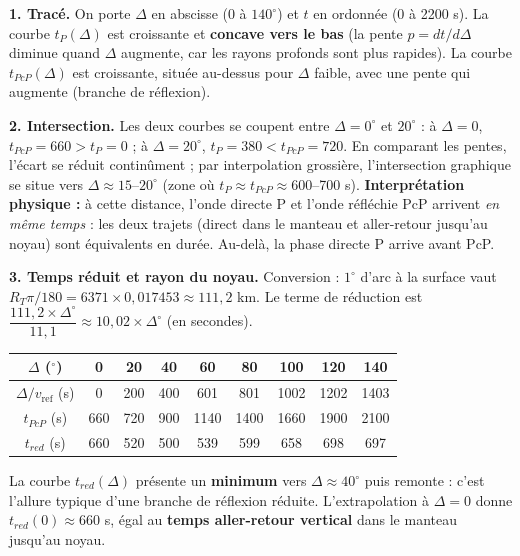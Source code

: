 \documentclass[11pt]{article}
\begin{document}
\begin{corrige}
\textbf{1. Tracé.} On porte $\Delta$ en abscisse (0 à $140^\circ$) et $t$ en ordonnée (0 à 2200 s). La courbe $t_P(\Delta)$ est croissante et \textbf{concave vers le bas} (la pente $p = dt/d\Delta$ diminue quand $\Delta$ augmente, car les rayons profonds sont plus rapides). La courbe $t_{PcP}(\Delta)$ est croissante, située au-dessus pour $\Delta$ faible, avec une pente qui augmente (branche de réflexion).

\textbf{2. Intersection.} Les deux courbes se coupent entre $\Delta = 0^\circ$ et $20^\circ$ : à $\Delta = 0$, $t_{PcP} = 660 > t_P = 0$ ; à $\Delta = 20^\circ$, $t_P = 380 < t_{PcP} = 720$. En comparant les pentes, l'écart se réduit continûment ; par interpolation grossière, l'intersection graphique se situe vers $\Delta \approx 15$--$20^\circ$ (zone où $t_P \approx t_{PcP} \approx 600$--700 s). \textbf{Interprétation physique :} à cette distance, l'onde directe P et l'onde réfléchie PcP arrivent \emph{en même temps} : les deux trajets (direct dans le manteau et aller-retour jusqu'au noyau) sont équivalents en durée. Au-delà, la phase directe P arrive avant PcP.

\textbf{3. Temps réduit et rayon du noyau.} Conversion : $1^\circ$ d'arc à la surface vaut $R_T \pi/180 = 6371 \times 0{,}017453 \approx 111{,}2$ km. Le terme de réduction est $\dfrac{111{,}2 \times \Delta^\circ}{11{,}1} \approx 10{,}02 \times \Delta^\circ$ (en secondes).

\begin{center}
\begin{tabular}{|c|cccccccc|}\hline
$\Delta$ ($^\circ$) & 0 & 20 & 40 & 60 & 80 & 100 & 120 & 140 \\ \hline
$\Delta / v_{\text{ref}}$ (s) & 0 & 200 & 400 & 601 & 801 & 1002 & 1202 & 1403 \\
$t_{PcP}$ (s) & 660 & 720 & 900 & 1140 & 1400 & 1660 & 1900 & 2100 \\ \hline
$t_{red}$ (s) & 660 & 520 & 500 & 539 & 599 & 658 & 698 & 697 \\ \hline
\end{tabular}
\end{center}

La courbe $t_{red}(\Delta)$ présente un \textbf{minimum} vers $\Delta \approx 40^\circ$ puis remonte : c'est l'allure typique d'une branche de réflexion réduite. L'extrapolation à $\Delta = 0$ donne $t_{red}(0) \approx 660$ s, égal au \textbf{temps aller-retour vertical} dans le manteau jusqu'au noyau.


\end{corrige}
\end{document}
